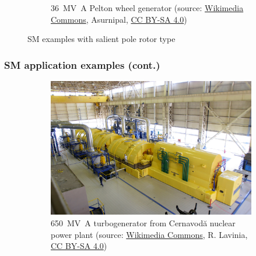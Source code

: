 \begin{frame}
\begin{figure}
\begin{subfigure}{0.49\textwidth}
			\caption{\SI[tight-spacing=true]{36}{\mega\volt\ampere} Pelton wheel generator (source: \href{https://commons.wikimedia.org/wiki/File:Wald_am_Arlberg-OeBB_Spullersee_power_plant-M1-Rotor-09ASD.jpg}{Wikimedia Commons},  	Asurnipal, \href{https://creativecommons.org/licenses/by-sa/4.0/deed}{CC BY-SA 4.0})} 
		\end{subfigure}
        \caption{SM examples with salient pole rotor type} 
        \label{fig:examples_SM_applications_01}
	\end{figure}
\end{frame}

\begin{frame}
	\frametitle{SM application examples (cont.)}
	\begin{figure}
		\centering
		\begin{subfigure}{0.49\textwidth}
			\centering
			\includegraphics[height=0.55\textheight]{fig/lec07/Turbogenerator.jpg}
			\caption{\SI{650}{\mega\volt\ampere} turbogenerator from Cernavodă nuclear power plant (source: \href{https://commons.wikimedia.org/wiki/File:Grupul_turbogenerator_CNE_Cernavoda.jpg}{Wikimedia Commons}, R. Lavinia, \href{https://creativecommons.org/licenses/by-sa/4.0/deed}{CC BY-SA 4.0})}
		\end{subfigure}
		\hfill
		\begin{subfigure}{0.49\textwidth}
			\centering

\end{subfigure}
\end{figure}
\end{frame}
